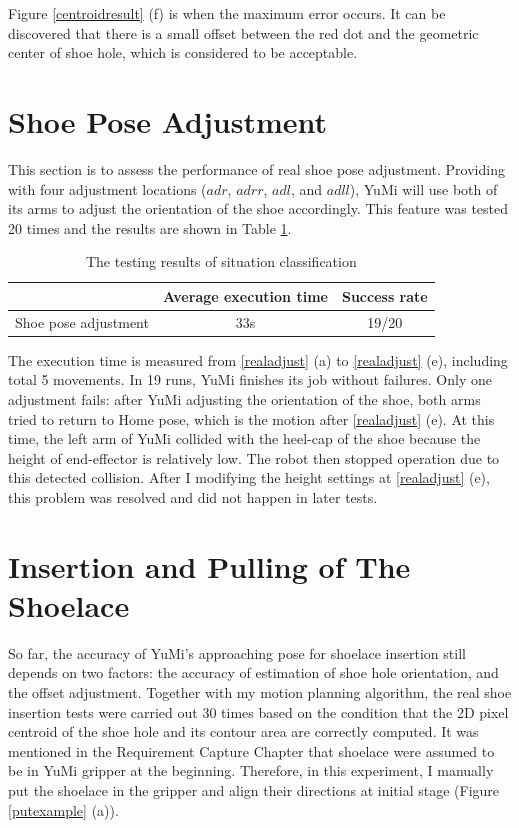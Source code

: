 Figure \ref{centroidresult} (f) is when the maximum error occurs. It can be discovered that there is a small offset between the red dot and the geometric center of shoe hole, which is considered to be acceptable.

\section{Shoe Pose Adjustment}
This section is to assess the performance of real shoe pose adjustment. Providing with four adjustment locations ($adr$, $adrr$, $adl$, and $adll$), YuMi will use both of its arms to adjust the orientation of the shoe accordingly. This feature was tested 20 times and the results are shown in Table \ref{adjusttest}.

\begin{table}[H]
\centering
\begin{tabular}{||c||c|c||}
\hline
 & Average execution time & Success rate \\ \hline \hline
Shoe pose adjustment & 33s & 19/20 \\ \hline
\end{tabular}
\caption{The testing results of situation classification}
\label{adjusttest}
\end{table}

The execution time is measured from \ref{realadjust} (a) to \ref{realadjust} (e), including total 5 movements. In 19 runs, YuMi finishes its job without failures. Only one adjustment fails: after YuMi adjusting the orientation of the shoe, both arms tried to return to Home pose, which is the motion after \ref{realadjust} (e). At this time, the left arm of YuMi collided with the heel-cap of the shoe because the height of end-effector is relatively low. The robot then stopped operation due to this detected collision. After I modifying the height settings at \ref{realadjust} (e), this problem was resolved and did not happen in later tests.


\section{Insertion and Pulling of The Shoelace}
So far, the accuracy of YuMi's approaching pose for shoelace insertion still depends on two factors: the accuracy of estimation of shoe hole orientation, and the offset adjustment. Together with my motion planning algorithm, the real shoe insertion tests were carried out 30 times based on the condition that the 2D pixel centroid of the shoe hole and its contour area are correctly computed. It was mentioned in the Requirement Capture Chapter that shoelace were assumed to be in YuMi gripper at the beginning. Therefore, in this experiment, I manually put the shoelace in the gripper and align their directions at initial stage (Figure \ref{putexample} (a)).

